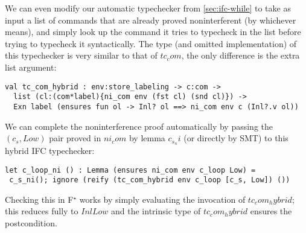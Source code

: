 \documentclass[sigplan,screen]{acmart}\settopmatter{}
\newcommand\fstar{F$^\star$\xspace}
\begin{document}
We can even modify our automatic typechecker from \autoref{sec:ifc-while} 
to take as input a list of commands that are already proved
noninterferent (by whichever means), and simply look up the command it
tries to typecheck in the list before trying to typecheck it syntactically.
%
The type (and omitted implementation) of this typechecker is very
similar to that of \ls$tc_com$, the only difference is the extra list argument:
%
\begin{lstlisting}
val tc_com_hybrid : env:store_labeling -> c:com -> 
  list (cl:(com*label){ni_com env (fst cl) (snd cl)}) ->
  Exn label (ensures fun ol -> Inl? ol ==> ni_com env c (Inl?.v ol))
\end{lstlisting}
%
We can complete the noninterference proof automatically by passing the
\ls$(c_s, Low)$ pair proved in \ls$ni_com$ by lemma
\ls$c_s_ni$ (or directly by SMT) to this hybrid IFC typechecker:
%
\begin{lstlisting}
let c_loop_ni () : Lemma (ensures ni_com env c_loop Low) =
 c_s_ni(); ignore (reify (tc_com_hybrid env c_loop [c_s, Low]) ())
\end{lstlisting}
%
Checking this in \fstar{} works by simply evaluating the invocation
of \ls$tc_com_hybrid$; this reduces fully to \ls$Inl Low$ and
the intrinsic type of \ls$tc_com_hybrid$ ensures the postcondition.





\end{document}
